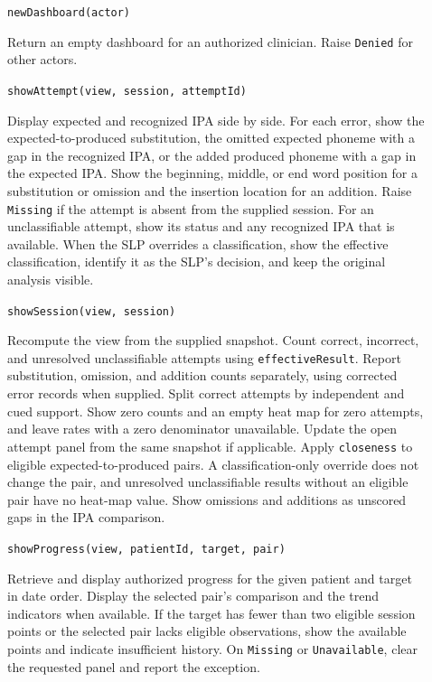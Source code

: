 \documentclass[12pt, titlepage]{article}
\begin{document}
\begin{description}
\item[] \texttt{newDashboard(actor)}\par
Return an empty dashboard for an authorized
clinician. Raise \texttt{Denied} for other actors.
\item[] \texttt{showAttempt(view, session, attemptId)}\par
Display expected and recognized IPA side by side. For each error, show the
expected-to-produced substitution, the omitted expected phoneme with a gap
in the recognized IPA, or the added produced phoneme with a gap in the
expected IPA. Show the beginning, middle, or end word position for a
substitution or omission and the insertion location for an addition. Raise
\texttt{Missing} if the attempt is absent from the supplied session. For an
unclassifiable attempt, show its status and any recognized IPA that is
available. When the SLP overrides a classification, show the effective
classification, identify it as the SLP's decision, and keep the original
analysis visible.
\item[] \texttt{showSession(view, session)}\par
Recompute the view from the supplied
snapshot. Count correct, incorrect, and unresolved unclassifiable attempts
using \texttt{effectiveResult}. Report substitution, omission, and addition
counts separately, using corrected error records when supplied. Split
correct attempts by independent and
cued support. Show zero counts and an empty heat map for zero attempts, and
leave rates with a zero denominator unavailable. Update the open attempt
panel from the same snapshot if applicable. Apply \texttt{closeness} to
eligible expected-to-produced pairs. A classification-only override does
not change the pair, and unresolved unclassifiable results without an
eligible pair have no heat-map value. Show omissions and additions as
unscored gaps in the IPA comparison.
\item[] \texttt{showProgress(view, patientId, target, pair)}\par
Retrieve and display
authorized progress for the given patient and target in date order.
Display the selected pair's comparison and the trend indicators when
available. If the target has fewer than two eligible session points or
the selected pair lacks eligible observations, show the available points
and indicate insufficient history. On
\texttt{Missing} or \texttt{Unavailable}, clear the requested panel and
report the exception.
\end{description}
\end{document}
